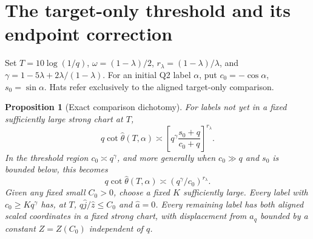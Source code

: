 \documentclass[11pt]{article}
\newtheorem{proposition}[theorem]{Proposition}
\begin{document}
\section{The target-only threshold and its endpoint correction}
Set $T=10\log(1/q)$, $\omega=(1-\lambda)/2$,
$r_\lambda=(1-\lambda)/\lambda$, and
$\gamma=1-5\lambda+2\lambda/(1-\lambda)$.
For an initial Q2 label $\alpha$, put $c_0=-\cos\alpha$,
$s_0=\sin\alpha$. Hats refer exclusively to the aligned target-only
comparison.
\begin{proposition}[Exact comparison dichotomy]
\label{an03rcetv1:dichotomy}
For labels not yet in a fixed sufficiently large strong chart at $T$,
\begin{equation}\label{an03rcetv1:regularized}
 q\cot\widehat\theta(T,\alpha)
 \asymp\left[q^\gamma\frac{s_0+q}{c_0+q}\right]^{r_\lambda}.
\end{equation}
In the threshold region $c_0\asymp q^\gamma$, and more generally
when $c_0\gg q$ and $s_0$ is bounded below, this becomes
\begin{equation}\label{an03rcetv1:thresholdpower}
 q\cot\widehat\theta(T,\alpha)
 \asymp(q^\gamma/c_0)^{r_\lambda}.
\end{equation}
Given any fixed small $C_0>0$, choose a fixed $K$ sufficiently large.
Every label with $c_0\ge Kq^\gamma$ has, at $T$,
$q\widehat j/\widehat z\le C_0$ and $\widehat a=0$.
Every remaining label has both aligned scaled coordinates in a
fixed strong chart, with displacement from $a_q$ bounded by a
constant $Z=Z(C_0)$ independent of $q$.
\end{proposition}
\end{document}
